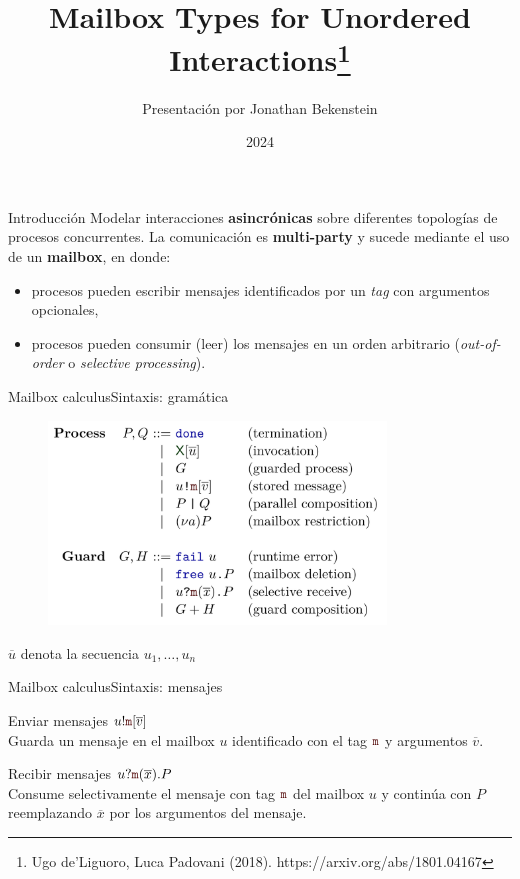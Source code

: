 \documentclass{beamer}
\title{Mailbox Types for Unordered Interactions\footnote{\tiny{Ugo de'Liguoro, Luca Padovani (2018). https://arxiv.org/abs/1801.04167}}}
\author{Presentación por Jonathan Bekenstein}
\institute{Materia optativa sobre Tipos Comportamentales y Contratos}
\date{2024}
\newcommand{\msgtag}[1]{\texttt{\textcolor{msg-color}{#1}}}
\newcommand{\msgstore}[2]{\msgtag{#1}[\overline{#2}]}
\newcommand{\msgreceive}[2]{\msgtag{#1}(\overline{#2})}
\begin{document}
\frame{\titlepage}

\begin{frame}{Introducción}
    Modelar interacciones \textbf{asincrónicas} sobre diferentes topologías de procesos concurrentes. La comunicación es \textbf{multi-party} y sucede mediante el uso de un \textbf{mailbox}, en donde:
    \begin{itemize}
        \item procesos pueden escribir mensajes identificados por un \emph{tag} con argumentos opcionales,
        \item procesos pueden consumir (leer) los mensajes en un orden arbitrario (\emph{out-of-order} o \emph{selective processing}).
    \end{itemize}
    \center
    \vspace{-1em}
\end{frame}

\begin{frame}{Mailbox calculus}{Sintaxis: gramática}
    \begin{figure}[H]
        \centering
        \includegraphics[width=0.8\textwidth]{syntax}
    \end{figure}

    \footnotesize{$\overline{u}$ denota la secuencia $u_1, \dots, u_n$}
\end{frame}

\begin{frame}{Mailbox calculus}{Sintaxis: mensajes}
    \begin{block}{Enviar mensajes}
        $u!\msgstore{m}{v}$
        \\ Guarda un mensaje en el mailbox $u$ identificado con el tag $\msgtag{m}$ y argumentos $\overline{v}$.
    \end{block}

    \begin{block}{Recibir mensajes}
        $u?\msgreceive{m}{x}.P$ \\ Consume selectivamente el mensaje con tag $\msgtag{m}$ del mailbox $u$ y continúa con $P$ reemplazando $\overline{x}$ por los argumentos del mensaje.
    \end{block}
\end{frame}
\end{document}
